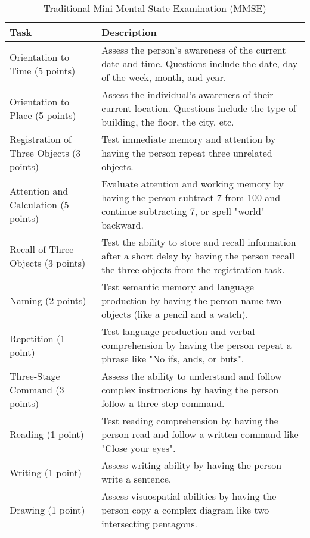 \begin{table}[h!]
\centering
\caption{Traditional Mini-Mental State Examination (MMSE)}
\begin{tabular}{|p{}|p{}|}
\hline
\textbf{Task} & \textbf{Description} \\
\hline
Orientation to Time (5 points) & Assess the person's awareness of the current date and time. Questions include the date, day of the week, month, and year. \\
\hline
Orientation to Place (5 points) & Assess the individual's awareness of their current location. Questions include the type of building, the floor, the city, etc. \\
\hline
Registration of Three Objects (3 points) & Test immediate memory and attention by having the person repeat three unrelated objects. \\
\hline
Attention and Calculation (5 points) & Evaluate attention and working memory by having the person subtract 7 from 100 and continue subtracting 7, or spell "world" backward. \\
\hline
Recall of Three Objects (3 points) & Test the ability to store and recall information after a short delay by having the person recall the three objects from the registration task. \\
\hline
Naming (2 points) & Test semantic memory and language production by having the person name two objects (like a pencil and a watch). \\
\hline
Repetition (1 point) & Test language production and verbal comprehension by having the person repeat a phrase like "No ifs, ands, or buts". \\
\hline
Three-Stage Command (3 points) & Assess the ability to understand and follow complex instructions by having the person follow a three-step command. \\
\hline
Reading (1 point) & Test reading comprehension by having the person read and follow a written command like "Close your eyes". \\
\hline
Writing (1 point) & Assess writing ability by having the person write a sentence. \\
\hline
Drawing (1 point) & Assess visuospatial abilities by having the person copy a complex diagram like two intersecting pentagons. \\
\hline
\end{tabular}
\label{tab:traditional-mmse}
\end{table}



